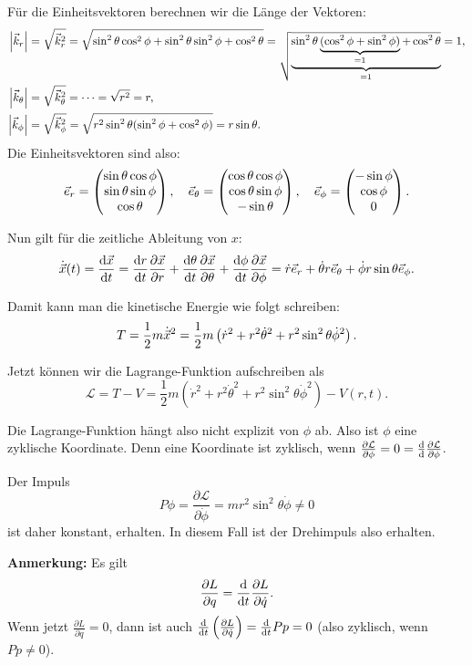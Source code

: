 Für die Einheitsvektoren berechnen wir die Länge der Vektoren:
\begin{align*}
	\left\lvert \vec{k}_r \right\rvert &= \sqrt{\vec{k}_r^2} = \sqrt{\sin^2 \theta \cos^2 \phi + \sin^2 \theta \sin^2 \phi + \cos^2 \theta} = \sqrt{\underbrace{\sin^2 \theta \underbrace{(\cos^2 \phi + \sin^2 \phi)}_{ = 1} + \cos^2 \theta}_{= 1}} = 1, \\
	\left\lvert \vec{k}_\theta \right\rvert &= \sqrt{\vec{k}_\theta^2} = \dots = \sqrt{r^2} = r, \\
	\left\lvert \vec{k}_\phi \right\rvert &= \sqrt{\vec{k}_\phi^2} = \sqrt{r^2 \sin^2 \theta (\sin^2 \phi + \cos^2 \phi)} = r \sin \theta
	\text{.}
\end{align*}
Die Einheitsvektoren sind also:
\[
	\vec{e}_r = \begin{pmatrix} \sin \theta \cos \phi \\ \sin \theta \sin \phi \\ \cos \theta \end{pmatrix},
	\quad 
	\vec{e}_\theta = \begin{pmatrix} \cos \theta \cos \phi \\ \cos \theta \sin \phi \\ - \sin \theta \end{pmatrix},
	\quad 
	\vec{e}_\phi = \begin{pmatrix} - \sin \phi \\ \cos \phi \\ 0 \end{pmatrix}
	\text{.}
\]

Nun gilt für die zeitliche Ableitung von $x$:
\[
	\dot{\vec{x}}(t) 
	= \frac{\mathrm{d}\vec{x}}{\mathrm{d}t} 
	= \frac{\mathrm{d}r}{\mathrm{d}t} \frac{\partial \vec{x}}{\partial r}
	+ \frac{\mathrm{d}\theta}{\mathrm{d}t} \frac{\partial \vec{x}}{\partial \theta} 
	+ \frac{\mathrm{d}\phi}{\mathrm{d}t} \frac{\partial \vec{x}}{\partial \phi}
	= \dot{r} \vec{e}_r + \dot{\theta} r \vec{e}_\theta + \dot{\phi} r \sin \theta \vec{e}_\phi
	\text{.}
\]

Damit kann man die kinetische Energie wie folgt schreiben:
\[
	T = \frac{1}{2} m \dot{\vec{x}}^2 = \frac{1}{2} m \left( \dot{r}^2 + r^2 \dot{\theta}^2 + r^2 \sin^2 \theta \dot{\phi}^2 \right)
	\text{.}
\]

Jetzt können wir die Lagrange-Funktion aufschreiben als 
\[
	\mathcal{L} = T - V = \frac{1}{2} m \left( \dot{r}^2 + r^2 \dot{\theta}^2 + r^2 \sin^2 \theta \dot{\phi}^2 \right) - V(r, t)
	\text{.}
\]

Die Lagrange-Funktion hängt also nicht explizit von $\phi$ ab. Also ist $\phi$ eine zyklische Koordinate. Denn eine Koordinate ist zyklisch, wenn $\frac{\partial \mathcal{L}}{\partial \phi} = 0 = \frac{\mathrm{d}}{\mathrm{d}} \frac{\partial \mathcal{L}}{\partial \phi}$.

Der Impuls 
\[
	P \phi = \frac{\partial \mathcal{L}}{\partial \dot{\phi}} = mr^2 \sin^2 \theta \dot{\phi} \neq 0
\]
ist daher konstant, erhalten. In diesem Fall ist der Drehimpuls also erhalten.

\textbf{Anmerkung:} Es gilt
\[
	\frac{\partial L}{\partial q} = \frac{\mathrm{d}}{\mathrm{d}t} \frac{\partial L}{\partial \dot{q}}
	\text{.}
\]
Wenn jetzt $\frac{\partial L}{\partial q} = 0$, dann ist auch $\frac{\mathrm{d}}{\mathrm{d}t} \left( \frac{\partial L}{\partial \dot{q}} \right) = \frac{\mathrm{d}}{\mathrm{d}t} Pp = 0$ (also zyklisch, wenn $Pp \neq 0$).